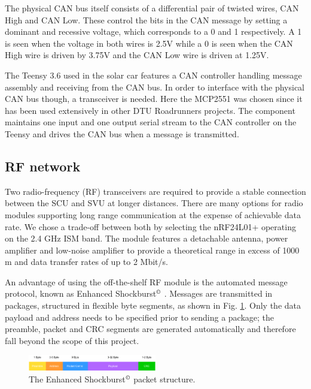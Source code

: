 \documentclass[conference]{IEEEtran}
\begin{document}
The physical CAN bus itself consists of a differential pair of twisted wires, CAN High and CAN Low. These control the bits in the CAN message by setting a dominant and recessive voltage, which corresponds to a 0 and 1 respectively. A 1 is seen when the voltage in both wires is 2.5V while a 0 is seen when the CAN High wire is driven by 3.75V and the CAN Low wire is driven at 1.25V. 

The Teensy 3.6 used in the solar car features a CAN controller handling message assembly and receiving from the CAN bus. In order to interface with the physical CAN bus though, a transceiver is needed. Here the MCP2551 was chosen since it has been used extensively in other DTU Roadrunners projects. The component maintains one input and one output serial stream to the CAN controller on the Teensy and drives the CAN bus when a message is transmitted.

\subsection{RF network} %
Two radio-frequency (RF) transceivers are required to provide a stable connection between the SCU and SVU at longer distances. There are many options for radio modules supporting long range communication at the expense of achievable data rate. We chose a trade-off between both by selecting the nRF24L01+ operating on the 2.4 GHz ISM band. The module features a detachable antenna, power amplifier and low-noise amplifier to provide a theoretical range in excess of 1000 m and data transfer rates of up to 2 Mbit/s.

An advantage of using the off-the-shelf RF module is the automated message protocol, known as Enhanced Shockburst$^\copyright$ \cite{shockburst}. Messages are transmitted in packages, structured in flexible byte segments, as shown in Fig. \ref{fig:shockburst}. Only the data payload and address needs to be specified prior to sending a package; the preamble, packet and CRC segments are generated automatically and therefore fall beyond the scope of this project. 

\begin{figure}[h]
    \centering
    \includegraphics[width=0.5\textwidth]{documentation/images/EnhancedShockburst.pdf}
    \caption{The Enhanced Shockburst$^\copyright$ packet structure.}
    \label{fig:shockburst}
\end{figure}
\end{document}

